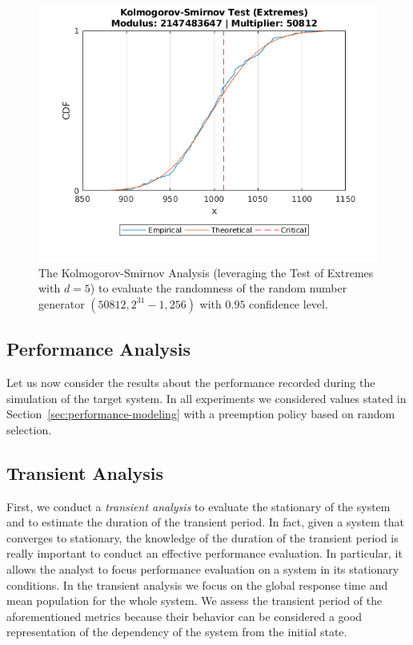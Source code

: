 \begin{figure}
	\includegraphics[width=\columnwidth]{fig/evaluation-randomness-kolmogorov-smirnov-50812}
	\caption{The Kolmogorov-Smirnov Analysis (leveraging the Test of Extremes with $d=5$) to evaluate the randomness of the random number generator $(50812,2^{31}-1, 256)$ with $0.95$ confidence level.}
	\label{fig:evaluation-randomness-kolmogorov-smirnov-50812}
\end{figure}


\subsection{Performance Analysis}
Let us now consider the results about the performance recorded during the simulation of the target system.
In all experiments we considered values stated in Section~\ref{sec:performance-modeling} with a preemption policy based on random selection.

\subsection{Transient Analysis}
\label{sec:evaluation-transient-analysis}
First, we conduct a \textit{transient analysis} to evaluate the stationary of the system and to estimate the duration of the transient period.
%
In fact, given a system that converges to stationary, the knowledge of the duration of the transient period is really important to conduct an effective performance evaluation. In particular, it allows the analyst to focus performance evaluation on a system in its stationary conditions.
%
In the transient analysis we focus on the global response time and mean population for the whole system.
%
We assess the transient period of the aforementioned metrics because their behavior can be considered a good representation of the dependency of the system from the initial state.

